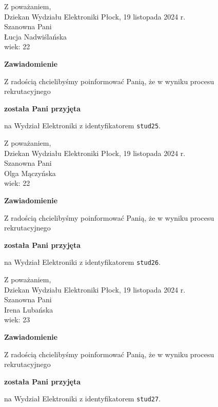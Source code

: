 \documentclass[12pt,a4paper]{article}
\begin{document}
\noindent
Z poważaniem,\\
Dziekan
Wydziału Elektroniki
\newpage
\hfill Płock, 19 listopada 2024 r.\\ 
\noindent 
Szanowna Pani \\
Łucja Nadwiślańska \\
wiek: 22

\bigskip

\begin{center}
{\Large\textbf{Zawiadomienie}}
\end{center}
\bigskip
Z radością chcielibyśmy poinformować Panią, że w wyniku procesu rekrutacyjnego
\begin{center}
\textsf{\textbf{została Pani przyjęta}} 
\end{center}
na Wydział Elektroniki z identyfikatorem \verb|stud25|.
\vspace{2cm}

\noindent
Z poważaniem,\\
Dziekan
Wydziału Elektroniki
\newpage
\hfill Płock, 19 listopada 2024 r.\\ 
\noindent 
Szanowna Pani \\
Olga Mączyńska \\
wiek: 22

\bigskip

\begin{center}
{\Large\textbf{Zawiadomienie}}
\end{center}
\bigskip
Z radością chcielibyśmy poinformować Panią, że w wyniku procesu rekrutacyjnego
\begin{center}
\textsf{\textbf{została Pani przyjęta}} 
\end{center}
na Wydział Elektroniki z identyfikatorem \verb|stud26|.
\vspace{2cm}

\noindent
Z poważaniem,\\
Dziekan
Wydziału Elektroniki
\newpage
\hfill Płock, 19 listopada 2024 r.\\ 
\noindent 
Szanowna Pani \\
Irena Lubańska  \\
wiek: 23

\bigskip

\begin{center}
{\Large\textbf{Zawiadomienie}}
\end{center}
\bigskip
Z radością chcielibyśmy poinformować Panią, że w wyniku procesu rekrutacyjnego
\begin{center}
\textsf{\textbf{została Pani przyjęta}} 
\end{center}
na Wydział Elektroniki z identyfikatorem \verb|stud27|.
\vspace{2cm}
\end{document}

